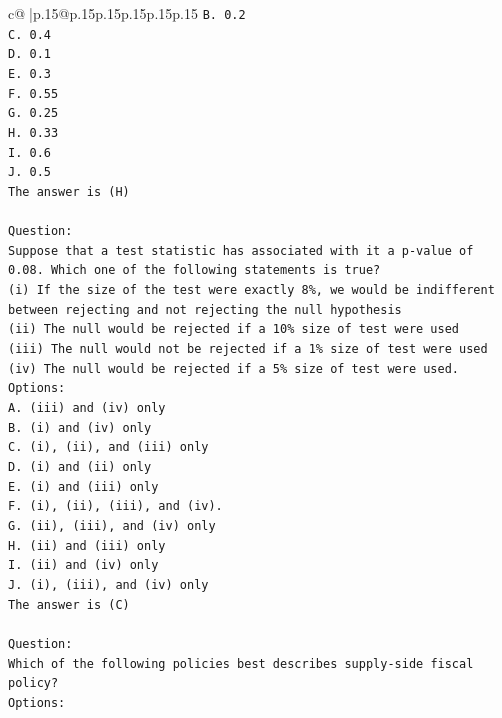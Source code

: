\documentclass{article}
\begin{document}
{\begin{supertabular}{c@{$\;$}|p{.15\linewidth}@{}p{.15\linewidth}p{.15\linewidth}p{.15\linewidth}p{.15\linewidth}p{.15\linewidth}}
{{{\texttt{B. 0.2} \\
\texttt{C. 0.4} \\
\texttt{D. 0.1} \\
\texttt{E. 0.3} \\
\texttt{F. 0.55} \\
\texttt{G. 0.25} \\
\texttt{H. 0.33} \\
\texttt{I. 0.6} \\
\texttt{J. 0.5} \\
\texttt{The answer is (H)} \\
\\ 
\texttt{Question:} \\
\texttt{Suppose that a test statistic has associated with it a p{-}value of 0.08. Which one of the following statements is true?} \\
\texttt{(i) If the size of the test were exactly 8\%, we would be indifferent between rejecting and not rejecting the null hypothesis} \\
\texttt{(ii) The null would be rejected if a 10\% size of test were used} \\
\texttt{(iii) The null would not be rejected if a 1\% size of test were used} \\
\texttt{(iv) The null would be rejected if a 5\% size of test were used.} \\
\texttt{Options:} \\
\texttt{A. (iii) and (iv) only} \\
\texttt{B. (i) and (iv) only} \\
\texttt{C. (i), (ii), and (iii) only} \\
\texttt{D. (i) and (ii) only} \\
\texttt{E. (i) and (iii) only} \\
\texttt{F. (i), (ii), (iii), and (iv).} \\
\texttt{G. (ii), (iii), and (iv) only} \\
\texttt{H. (ii) and (iii) only} \\
\texttt{I. (ii) and (iv) only} \\
\texttt{J. (i), (iii), and (iv) only} \\
\texttt{The answer is (C)} \\
\\ 
\texttt{Question:} \\
\texttt{Which of the following policies best describes supply{-}side fiscal policy?} \\
\texttt{Options:} \\
}}}
\end{supertabular}}
\end{document}
